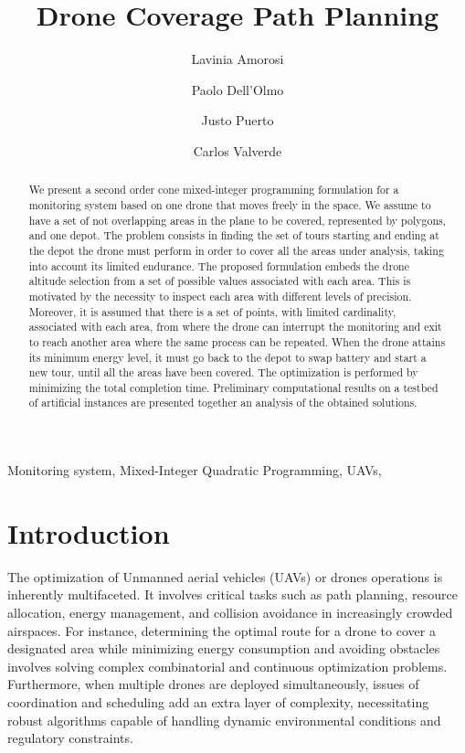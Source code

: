 \documentclass[12pt]{elsarticle}
\title{Drone Coverage Path Planning}
\author[mymainaddress]{Lavinia Amorosi}
\author[mymainaddress]{Paolo Dell'Olmo}
\author[mysecondaryaddress]{Justo Puerto}
\author[mysecondaryaddress]{Carlos Valverde \corref{mycorrespondingauthor}}
\begin{document}
\begin{frontmatter}


\begin{abstract}
We present a second order cone mixed-integer programming formulation for a monitoring system based on one drone that moves freely in the space. We assume to have a set of not overlapping areas in the plane to be covered, represented by polygons, and one depot. The problem consists in finding the set of tours starting and ending at the depot the drone must perform in order to cover all the areas under analysis, taking into account its limited endurance. The proposed formulation embeds the drone altitude selection from a set of possible values associated with each area. This is motivated by the necessity to inspect each area with different levels of precision. Moreover, it is assumed that there is a set of points, with limited cardinality, associated with each area, from where the drone can interrupt the monitoring and exit to reach another area where the same process can be repeated. When the drone attains its minimum energy level, it must go back to the depot to swap battery and start a new tour, until all the areas have been covered. The optimization is performed by minimizing the total completion time. Preliminary computational results on a testbed of artificial instances are presented together an analysis of the obtained solutions.
\end{abstract}
\begin{keyword}
Monitoring system,  Mixed-Integer Quadratic Programming, UAVs, 
\end{keyword}

\end{frontmatter}
\section{Introduction}
The optimization of  Unmanned aerial vehicles (UAVs) or drones operations is inherently multifaceted. It involves critical tasks such as path planning, resource allocation, energy management, and collision avoidance in increasingly crowded airspaces. For instance, determining the optimal route for a drone to cover a designated area while minimizing energy consumption and avoiding obstacles involves solving complex combinatorial and continuous optimization problems. Furthermore, when multiple drones are deployed simultaneously, issues of coordination and scheduling add an extra layer of complexity, necessitating robust algorithms capable of handling dynamic environmental conditions and regulatory constraints.
\end{document}
